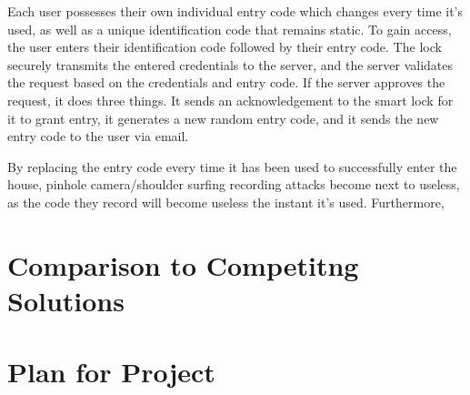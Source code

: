 \documentclass[conference]{IEEEtran}
\begin{document}
Each user possesses their own individual entry code which changes every time it’s used, as well as a unique identification code that remains static. To gain access, the user enters their identification code followed by their entry code. The lock securely transmits the entered credentials to the server, and the server validates the request based on the credentials and entry code. If the server approves the request, it does three things. It sends an acknowledgement to the smart lock for it to grant entry, it generates a new random entry code, and it sends the new entry code to the user via email. 

By replacing the entry code every time it has been used to successfully enter the house, pinhole camera/shoulder surfing recording attacks become next to useless, as the code they record will become useless the instant it’s used. Furthermore,
\section{Comparison to Competitng Solutions}

\section{Plan for Project}
\end{document}
